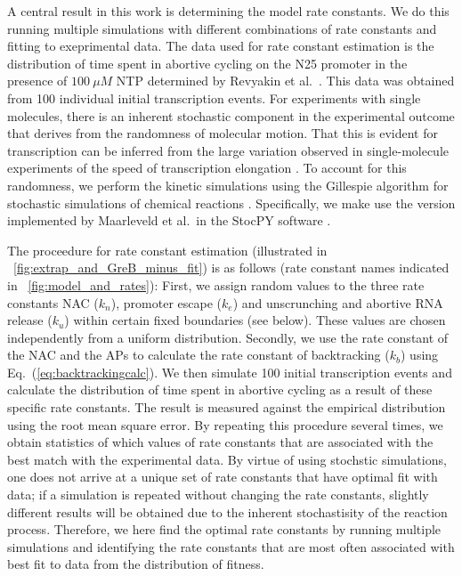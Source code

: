 A central result in this work is determining the model rate constants. We do
this running multiple simulations with different combinations of rate
constants and fitting to exeprimental data. The data used for rate constant
estimation is the distribution of time spent in abortive cycling on the N25
promoter in the presence of $100\ \mu M$ NTP determined by Revyakin et al.\
\cite{revyakin_abortive_2006}. This data was obtained from 100 individual
initial transcription events. For experiments with single molecules, there is
an inherent stochastic component in the experimental outcome that derives from
the randomness of molecular motion. That this is evident for transcription can
be inferred from the large variation observed in single-molecule experiments
of the speed of transcription elongation \cite{adelman_single_2002,
tolic-norrelykke_diversity_2004}. To account for this randomness, we perform
the kinetic simulations using the Gillespie algorithm for stochastic
simulations of chemical reactions \cite{gillespie_exact_1977}. Specifically,
we make use the version implemented by Maarleveld et al.\ in the StocPY
software \cite{maarleveld_stochpy:_2013}.

The proceedure for rate constant estimation (illustrated in
\FIG~\ref{fig:extrap_and_GreB_minus_fit}) is as follows (rate constant names indicated
in \FIG~\ref{fig:model_and_rates}): First, we assign random values to the
three rate constants NAC ($k_n$), promoter escape ($k_e$) and unscrunching and
abortive RNA release ($k_u$) within certain fixed boundaries (see below).
These values are chosen independently from a uniform distribution. Secondly,
we use the rate constant of the NAC and the APs to calculate the rate constant
of backtracking ($k_b$) using Eq.~(\ref{eq:backtrackingcalc}). We then
simulate 100 initial transcription events and calculate the distribution of
time spent in abortive cycling as a result of these specific rate constants.
The result is measured against the empirical distribution
\cite{revyakin_abortive_2006} using the root mean square error. By repeating
this procedure several times, we obtain statistics of which values of rate
constants that are associated with the best match with the experimental data.
By virtue of using stochstic simulations, one does not arrive at a unique set
of rate constants that have optimal fit with data; if a simulation is repeated
without changing the rate constants, slightly different results will be
obtained due to the inherent stochastisity of the reaction process. Therefore,
we here find the optimal rate constants by running multiple simulations and
identifying the rate constants that are most often associated with best fit to
data from the distribution of fitness.

